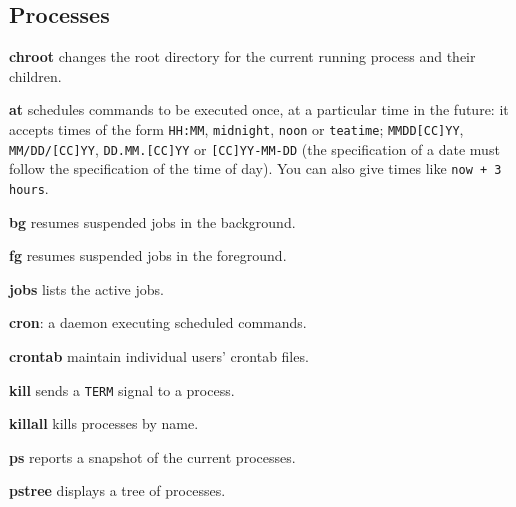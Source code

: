\subsection*{Processes}

\begin{enumx}
	\item [\cmd] \textbf{chroot} changes the root directory 
	for the current running process and their children.
\end{enumx}

\begin{enumx}
	\item [\cmd] \textbf{at} schedules commands to be executed once, 
	at a particular time in the future: it accepts times of the form 
	\texttt{HH:MM}, \texttt{midnight}, \texttt{noon} or \texttt{teatime}; 
	\texttt{MMDD[CC]YY}, \texttt{MM/DD/[CC]YY}, \texttt{DD.MM.[CC]YY} or 
	\texttt{[CC]YY-MM-DD} (the specification of a date 
	must follow the specification of the time of day).
	You can also give times like \texttt{now + 3 hours}.
\end{enumx}

\begin{enumx}
	\item [\cmd] \textbf{bg} resumes suspended jobs in the background.
	\item [\cmd] \textbf{fg} resumes suspended jobs in the foreground.
	\item [\cmd] \textbf{jobs} lists the active jobs.
\end{enumx}

\begin{enumx}
	\item [\cmd] \textbf{cron}: a daemon executing scheduled commands.
	\item [\cmd] \textbf{crontab} maintain individual users' crontab files.
\end{enumx}

\begin{enumx}
	\item [\cmd] \textbf{kill} sends a \texttt{TERM} signal to a process.
	\item [\cmd] \textbf{killall} kills processes by name.
\end{enumx}

\begin{enumx}
	\item [\cmd] \textbf{ps} reports a snapshot of the current processes.
	\item [\cmd] \textbf{pstree} displays a tree of processes.
\end{enumx}

